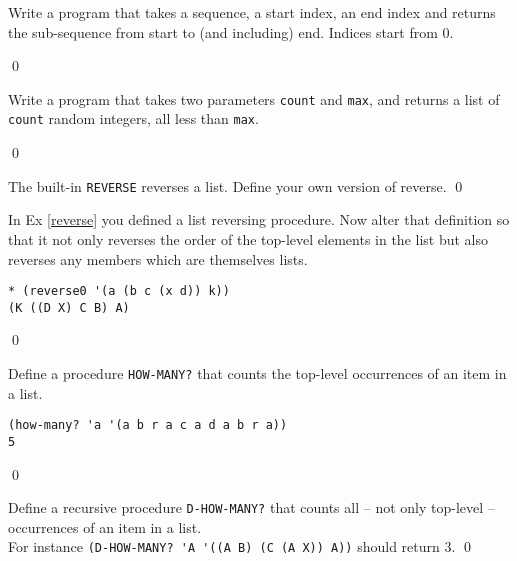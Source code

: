 \documentclass[a4paper,11pt]{article}
\begin{document}
\begin{uexercise}[*]
Write a program that takes a sequence, a start index, an end index
and returns the sub-sequence from start to (and including) end.
Indices start from 0.

\qed
\end{uexercise}

\begin{uexercise}[*]
Write a program that takes two parameters \Verb+count+ and \Verb+max+,
and returns a list of \Verb+count+ random integers, all less than
\Verb+max+.

\qed
\end{uexercise}

\begin{uexercise}
\label{reverse}
The built-in \Verb+REVERSE+ reverses a list. Define your own version of reverse.
\qed
\end{uexercise}

\begin{uexercise}

In Ex \ref{reverse} you defined a list reversing procedure. Now alter that definition so that it  not only reverses the order of the top-level elements in the list but also reverses any members which are themselves lists.

{\small
\begin{Verbatim}
* (reverse0 '(a (b c (x d)) k))
(K ((D X) C B) A)
\end{Verbatim}
}
\qed
\end{uexercise}


\begin{uexercise}

Define a procedure \Verb+HOW-MANY?+ that counts the top-level occurrences of an item in a list.

\begin{Verbatim}
(how-many? 'a '(a b r a c a d a b r a))
5
\end{Verbatim}
\qed
\end{uexercise}

\begin{uexercise}
Define a recursive procedure \Verb+D-HOW-MANY?+ that counts all – not only top-level – occurrences of an item in a list.\\ For instance \Verb+(D-HOW-MANY? 'A '((A B) (C (A X)) A))+ should return 3. 
\qed
\end{uexercise}
\end{document}
